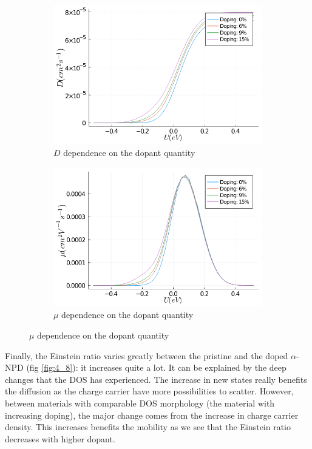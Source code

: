 \begin{figure}[htbp]
    \centering
    \begin{subfigure}[t]{0.49\textwidth}
        \centering
        \includegraphics*[width=\textwidth]{figures/4_thermal/d_doped.png}
        \caption{$D$ dependence on the dopant quantity\label{fig:4_6}}
    \end{subfigure}
    \begin{subfigure}[t]{0.49\textwidth}
        \centering
        \includegraphics*[width=\textwidth]{figures/4_thermal/mu_doped.png}
        \caption{$\mu$ dependence on the dopant quantity\label{fig:4_7}}
    \end{subfigure}
\end{figure}

Finally, the Einstein ratio varies greatly between the pristine and the doped $\alpha$-NPD (fig \ref{fig:4_8}): it increases quite a lot. It can be explained by the deep changes that the DOS has experienced. The increase in new states really benefits the diffusion as the charge carrier have more possibilities to scatter. However, between materials with comparable DOS morphology (the material with increasing doping), the major change comes from the increase in charge carrier density. This increases benefits the mobility as we see that the Einstein ratio decreases with higher dopant.

